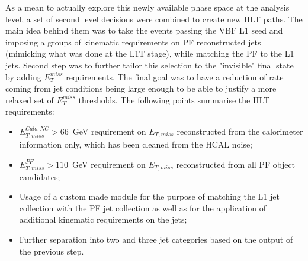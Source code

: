 \hspace{10pt} As a mean to actually explore this newly available phase space at the analysis level, a set of second level decisions were combined to create new HLT paths. The main idea behind them was to take the events passing the VBF L1 seed and imposing a groups of kinematic requirements on PF reconstructed jets (mimicking what was done at the L1T stage), while matching the PF to the L1 jets. Second step was to further tailor this selection to the "invisible" final state by adding $E_{T}^{miss}$ requirements. The final goal was to have a reduction of rate coming from jet conditions being large enough to be able to justify a more relaxed set of $E_{T}^{miss}$ thresholds. The following points summarise the HLT requirements:
\begin{itemize}
    \item $E^{Calo, NC}_{T,miss}>66$~GeV requirement on $E_{T,miss}$ reconstructed from the calorimeter information only, which has been cleaned from the HCAL noise;
    \item $E^{PF}_{T,miss}>110$~GeV requirement on $E_{T,miss}$ reconstructed from all PF object candidates;
    \item Usage of a custom made module for the purpose of matching the L1 jet collection with the PF jet collection as well as for the application of additional kinematic requirements on the jets;
    \item Further separation into two and three jet categories based on the output of the previous step.
\end{itemize}

